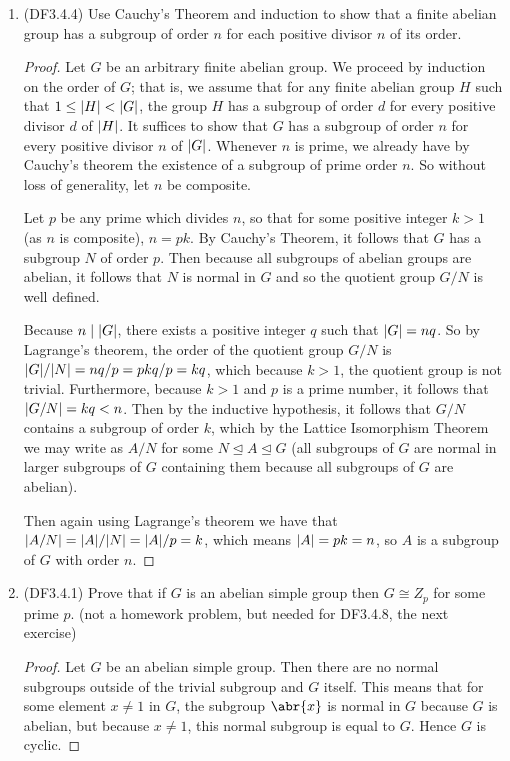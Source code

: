 \documentclass[11pt]{article}
\begin{document}
\begin{enumerate}
    \item (DF3.4.4) Use Cauchy's Theorem and induction to show that a finite abelian group has a subgroup of order $n$ for each positive divisor $n$ of its order.
    \begin{proof}
      Let $G$ be an arbitrary finite abelian group. We proceed by induction on the order of $G$; that is, we assume that for any finite abelian group $H$ such that $1\leq \abs{H} < \abs{G}$, the group $H$ has a subgroup of order $d$ for every positive divisor $d$ of $\abs{H}$. It suffices to show that $G$ has a subgroup of order $n$ for every positive divisor $n$ of $\abs{G}$. Whenever $n$ is prime, we already have by Cauchy's theorem the existence of a subgroup of prime order $n$. So without loss of generality, let $n$ be composite.
      
      Let $p$ be any prime which divides $n$, so that for some positive integer $k>1$ (as $n$ is composite), $n = pk$. By Cauchy's Theorem, it follows that $G$ has a subgroup $N$ of order $p$. Then because all subgroups of abelian groups are abelian, it follows that $N$ is normal in $G$ and so the quotient group $G/N$ is well defined.

      Because $n\mid \abs{G}$, there exists a positive integer $q$ such that $\abs{G} = nq$. So by Lagrange's theorem, the order of the quotient group $G/N$ is $\abs{G}/\abs{N} = nq/p = pkq/p = kq$, which because $k>1$, the quotient group is not trivial. Furthermore, because $k>1$ and $p$ is a prime number, it follows that $\abs{G/N} = kq < n$. Then by the inductive hypothesis, it follows that $G/N$ contains a subgroup of order $k$, which by the Lattice Isomorphism Theorem we may write as $A/N$ for some $N\unlhd A\unlhd G$ (all subgroups of $G$ are normal in larger subgroups of $G$ containing them because all subgroups of $G$ are abelian).

      Then again using Lagrange's theorem we have that $\abs{A/N} = \abs{A}/\abs{N} = \abs{A}/p = k$, which means $\abs{A} = pk = n$, so $A$ is a subgroup of $G$ with order $n$.
    \end{proof}
    \item (DF3.4.1) Prove that if $G$ is an abelian simple group then $G\cong Z_p$ for some prime $p$. (not a homework problem, but needed for DF3.4.8, the next exercise)
    \begin{proof}
      Let $G$ be an abelian simple group. Then there are no normal subgroups outside of the trivial subgroup and $G$ itself. This means that for some element $x\neq 1$ in $G$, the subgroup $\abr{x}$ is normal in $G$ because $G$ is abelian, but because $x\neq 1$, this normal subgroup is equal to $G$. Hence $G$ is cyclic. 
      

\end{proof}
\end{enumerate}
\end{document}

